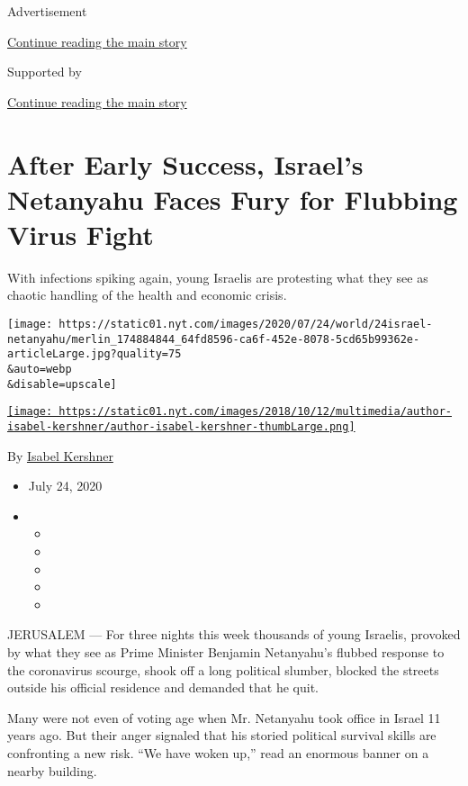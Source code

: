 Advertisement

\protect\hyperlink{after-top}{Continue reading the main story}

Supported by

\protect\hyperlink{after-sponsor}{Continue reading the main story}

\hypertarget{after-early-success-israels-netanyahu-faces-fury-for-flubbing-virus-fight}{%
\section{After Early Success, Israel's Netanyahu Faces Fury for Flubbing
Virus
Fight}\label{after-early-success-israels-netanyahu-faces-fury-for-flubbing-virus-fight}}

With infections spiking again, young Israelis are protesting what they
see as chaotic handling of the health and economic crisis.

\texttt{[image: https://static01.nyt.com/images/2020/07/24/world/24israel-netanyahu/merlin\_174884844\_64fd8596-ca6f-452e-8078-5cd65b99362e-articleLarge.jpg?quality=75\\\&auto=webp\\\&disable=upscale]}

\href{https://www.nytimes.com/by/isabel-kershner}{\texttt{[image: https://static01.nyt.com/images/2018/10/12/multimedia/author-isabel-kershner/author-isabel-kershner-thumbLarge.png]}}

By \href{https://www.nytimes.com/by/isabel-kershner}{Isabel Kershner}

\begin{itemize}
\item
  July 24, 2020
\item
  \begin{itemize}
  \item
  \item
  \item
  \item
  \item
  \end{itemize}
\end{itemize}

JERUSALEM --- For three nights this week thousands of young Israelis,
provoked by what they see as Prime Minister Benjamin Netanyahu's flubbed
response to the coronavirus scourge, shook off a long political slumber,
blocked the streets outside his official residence and demanded that he
quit.

Many were not even of voting age when Mr. Netanyahu took office in
Israel 11 years ago. But their anger signaled that his storied political
survival skills are confronting a new risk. ``We have woken up,'' read
an enormous banner on a nearby building.

